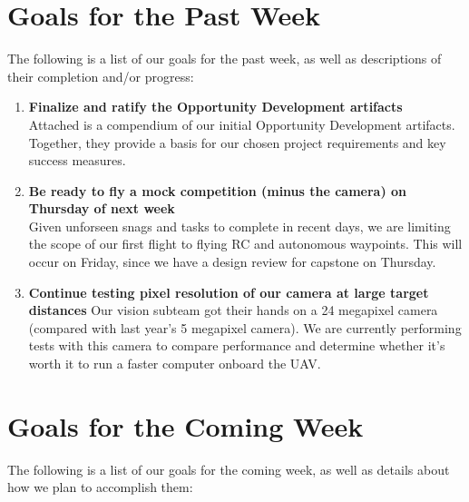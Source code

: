\documentclass[]{../auvsi_doc}
\begin{document}
\section{Goals for the Past Week}

The following is a list of our goals for the past week, as well as descriptions of their completion and/or progress:

\begin{enumerate}
\item \textbf{Finalize and ratify the Opportunity Development artifacts}\\
Attached is a compendium of our initial Opportunity Development artifacts. Together, they provide a basis for our chosen project requirements and key success measures.
\item \textbf{Be ready to fly a mock competition (minus the camera) on Thursday of next week}\\
Given unforseen snags and tasks to complete in recent days, we are limiting the scope of our first flight to flying RC and autonomous waypoints. This will occur on Friday, since we have a design review for capstone on Thursday.
\item \textbf{Continue testing pixel resolution of our camera at large target distances}
Our vision subteam got their hands on a 24 megapixel camera (compared with last year's 5 megapixel camera). We are currently performing tests with this camera to compare performance and determine whether it's worth it to run a faster computer onboard the UAV.
\end{enumerate}

\section{Goals for the Coming Week}

The following is a list of our goals for the coming week, as well as details about how we plan to accomplish them:
\end{document}
